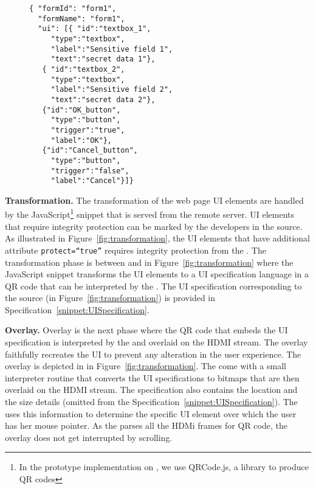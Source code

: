 \begin{figure}[t]
\begin{lstlisting}[mathescape=true]
{ "formId": "form1",
  "formName": "form1",
  "ui": [{ "id":"textbox_1",
     "type":"textbox",
     "label":"Sensitive field 1",
     "text":"secret data 1"},
   { "id":"textbox_2",
     "type":"textbox",
     "label":"Sensitive field 2",
     "text":"secret data 2"},
   {"id":"OK_button",
     "type":"button",
     "trigger":"true",
     "label":"OK"},    
   {"id":"Cancel_button",
     "type":"button",
     "trigger":"false",
     "label":"Cancel"}]}
\end{lstlisting}
\end{figure}

\begin{mylist}
\item \textbf{Transformation.} The transformation of the web page UI elements are handled by the \name JavaScript\footnote{In the prototype implementation on \name, we use QRCode.js, a \js library to produce QR codes} snippet that is served from the remote server. UI elements that require integrity protection can be marked by the developers in the \html source. As illustrated in Figure~\ref{fig:transformation}, the \html UI elements that have additional attribute \texttt{protect=``true''} requires integrity protection from the \device. The transformation phase is between \one and \two in Figure~\ref{fig:transformation} where the \name JavaScript snippet transforms the UI elements to a UI specification language in a QR code that can be interpreted by the \device. The UI specification corresponding to the \html source (in Figure~\ref{fig:transformation}) is provided in Specification~\ref{snippet:UISpecification}.

\item \textbf{Overlay.} Overlay is the next phase where the QR code that embeds the UI specification is interpreted by the \device and overlaid on the HDMI stream. The overlay faithfully recreates the UI to prevent any alteration in the user experience. The \device overlay is depicted in \three in Figure~\ref{fig:transformation}. The \device come with a small interpreter routine that converts the UI specifications to bitmaps that are then overlaid on the HDMI stream. The specification also contains the location and the size details (omitted from the Specification~\ref{snippet:UISpecification}). The \device uses this information to determine the specific UI element over which the user has her mouse pointer. As the \device parses all the HDMi frames for QR code, the overlay does not get interrupted by scrolling.
\end{mylist}

